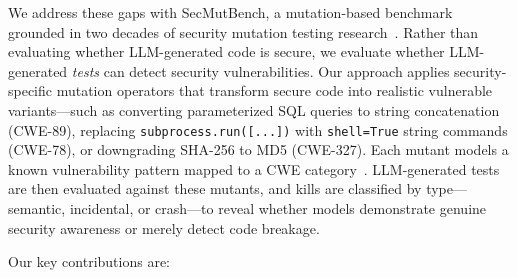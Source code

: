 \documentclass[sigconf,anonymous,review]{acmart}
\begin{document}
We address these gaps with SecMutBench, a mutation-based benchmark grounded in two decades of security mutation testing research~\cite{du2000testing,shahriar2008music,mouelhi2007mutation}. Rather than evaluating whether LLM-generated code is secure, we evaluate whether LLM-generated \emph{tests} can detect security vulnerabilities. Our approach applies  security-specific mutation operators that transform secure code into realistic vulnerable variants---such as converting parameterized SQL queries to string concatenation (CWE-89), replacing \texttt{subprocess.run([...])} with \texttt{shell=True} string commands (CWE-78), or downgrading SHA-256 to MD5 (CWE-327). Each mutant models a known vulnerability pattern mapped to a CWE category~\cite{mitre2024cwe}. LLM-generated tests are then evaluated against these mutants, and kills are classified by type---semantic,  incidental, or crash---to reveal whether models demonstrate genuine security awareness or merely detect code breakage.


Our key contributions are:
\end{document}
